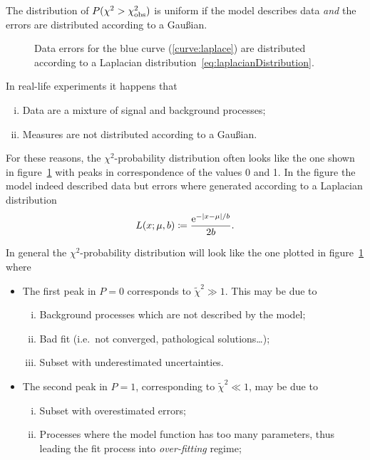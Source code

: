 \documentclass[
	10pt,
	draft
]{scrreprt}
\newcommand{\eu}{\ensuremath{\mathrm{e}}}
\begin{document}
The distribution of $P(\chi^2 > \chi^2_\textup{obs})$ is uniform if the model describes data \emph{and} the errors are distributed according to a Gau\ss{}ian.
\begin{figure}
	\centering
{}
	\caption{Data errors for the blue curve (\ref{curve:laplace}) are distributed according to a Laplacian distribution~\eqref{eq:laplacianDistribution}.}
	\label{fig:chiSquareProbNonFlat}
\end{figure}
In real-life experiments it happens that
\begin{enumerate}[i.]
	\item
Data are a mixture of signal and background processes;
	\item
Measures are not distributed according to a Gau\ss{}ian.
\end{enumerate}
For these reasons, the $\chi^2$-probability distribution often looks like the one shown in figure~\ref{fig:chiSquareProbNonFlat} with peaks in correspondence of the values \num{0} and \num{1}.
In the figure the model indeed described data but errors where generated according to a Laplacian distribution
\begin{equation}\label{eq:laplacianDistribution}
L(x;\mu,b) \coloneqq \frac{\eu^{-\abs{x-\mu}/b}}{2b}.
\end{equation}



In general the $\chi^2$-probability distribution will look like the one plotted in figure~\ref{fig:chiSquareProbNonFlat} where
\begin{itemize}
	\item
The first peak in $P = 0$ corresponds to $\tilde\chi^2\gg1$.
This may be due to
	\begin{enumerate}[i)]
		\item
Background processes which are not described by the model;
		\item
Bad fit (i.e.~not converged, pathological solutions\dots);
		\item
Subset with underestimated uncertainties.
\end{enumerate}
	\item
The second peak in $P=1$, corresponding to $\tilde\chi^2\ll1$, may be due to
	\begin{enumerate}[i)]
		\item
Subset with overestimated errors;
		\item
Processes where the model function has too many parameters, thus leading the fit process into \emph{over-fitting} regime;
\end{enumerate}
\end{itemize}
\end{document}
